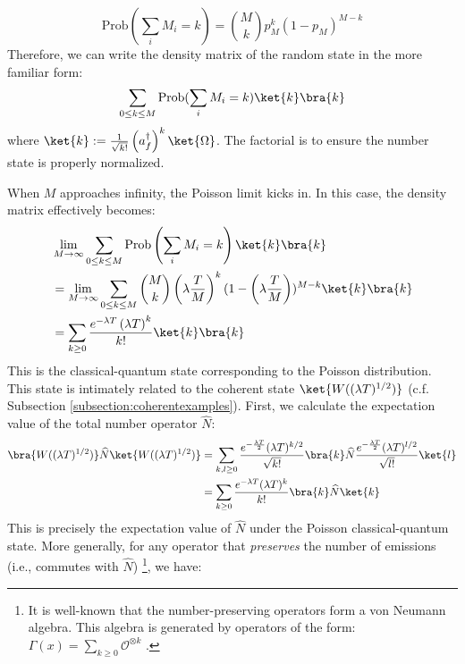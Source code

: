 \documentclass[a4paper,11pt]{article}
\theoremstyle{definition}
\numberwithin{equation}{section}
\newcommand{\lb}{\left(}
\newcommand{\rb}{\right)}
\newcommand{\nn}{\nonumber}
\begin{document}
\begin{equation}
    \text{Prob}(\sum_i M_i = k) = \binom{M}{k}p_M^k(1 - p_M)^{M - k}
\end{equation}
Therefore, we can write the density matrix of the random state in the more familiar form:
\begin{equation}
    \sum_{0\leq k\leq M}\text{Prob}(\sum_i M_i = k)\ket{k}\bra{k}
\end{equation}
where $\ket{k} := \frac{1}{\sqrt{k!}}\lb a_f^\dagger\rb^k\ket{\Omega}$. The factorial is to ensure the number state is properly normalized.

When $M$ approaches infinity, the Poisson limit kicks in. In this case, the density matrix effectively becomes:
\begin{align}
    \begin{split}
        &\lim_{M\rightarrow\infty}\sum_{0\leq k\leq M}\text{Prob}\lb\sum_i M_i = k\rb\ket{k}\bra{k} \nn\\
        &= \lim_{M\rightarrow\infty}\sum_{0\leq k\leq M}\binom{M}{k}\lb\lambda\frac{T}{M}\rb^k(1 - \lb\lambda\frac{T}{M}\rb)^{M - k}\ket{k}\bra{k}
        \\&=\sum_{k\geq 0}\frac{e^{-\lambda T}\lb\lambda T\rb^k}{k!}\ket{k}\bra{k}
    \end{split}
\end{align}
This is the classical-quantum state corresponding to the Poisson distribution. This state is intimately related to the coherent state $\ket{W((\lambda T)^{1/2})}$ (c.f. Subsection \ref{subsection:coherentexamples}). First, we calculate the expectation value of the total number operator $\widehat{N}$:
\begin{align}
    \begin{split}
        \bra{W((\lambda T)^{1/2})}\widehat{N}\ket{W((\lambda T)^{1/2})} &= \sum_{k,l\geq 0}\frac{e^{-\frac{\lambda T}{2}}(\lambda T)^{k/2}}{\sqrt{k!}}\bra{k}\widehat{N}\frac{e^{-\frac{\lambda T}{2}}(\lambda T)^{l/2}}{\sqrt{l!}}\ket{l}
        \\&=\sum_{k\geq 0}\frac{e^{-\lambda T}(\lambda T)^k}{k!}\bra{k}\widehat{N}\ket{k}
    \end{split}
\end{align}
This is precisely the expectation value of $\widehat{N}$ under the Poisson classical-quantum state. More generally, for any operator that \textit{preserves} the number of emissions (i.e., commutes with $\widehat{N}$) \footnote{It is well-known that the number-preserving operators form a von Neumann algebra. This algebra is generated by operators of the form: $\Gamma(x) = \sum_{k\geq 0}\mathcal{O}^{\otimes k}$ \cite{quantStoch}.}, we have:
\end{document}
